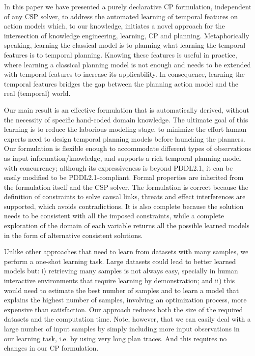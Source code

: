 \documentclass[10pt,journal,compsoc]{IEEEtran}
\begin{document}
In this paper we have presented a purely declarative CP formulation, independent of any CSP solver, to address the automated learning of temporal features on action models which, to our knowledge, initiates a novel approach for the intersection of knowledge engineering, learning, CP and planning. Metaphorically speaking, learning the classical model is to planning what learning the temporal features is to temporal planning. Knowing these features is useful in practice, where learning a classical planning model is not enough and needs to be extended with temporal features to 
increase its applicability.
In consequence, learning the temporal features bridges the gap between the planning action model and the real (temporal) world.


Our main result is an effective formulation that is automatically derived, without the necessity of specific hand-coded domain knowledge. The ultimate goal of this learning is to reduce the laborious modeling stage, to minimize the effort human experts need to design temporal planning models before launching the planners. Our formulation is flexible enough to accommodate different types of observations as input information/knowledge, and 
supports a rich temporal planning model with concurrency; although its expressiveness is beyond PDDL2.1, it can be easily modified to be PDDL2.1-compliant.
Formal properties are inherited from the formulation itself and the CSP solver. The formulation is correct because the definition of constraints to solve causal links, threats and effect interferences are supported, which avoids contradictions. It is also complete because the solution needs to be consistent with all the imposed constraints, while a complete exploration of the domain of each variable returns all the possible learned models in the form of alternative consistent solutions.



Unlike other approaches that need to learn from datasets with many samples, we perform a one-shot learning task. Large datasets could lead to better learned models but: i) retrieving many samples is not always easy, specially in human interactive environments that require learning by demonstration; and ii) this would need to estimate the best number of samples and to learn a model that explains the highest number of samples, involving an optimization process, more expensive than satisfaction. Our approach reduces both the size of the required datasets and the computation time. Note, however, that we can easily deal with a large number of input samples by simply including more input observations in our learning task, i.e. by using very long plan traces. And this requires no changes in our CP formulation.
\end{document}
